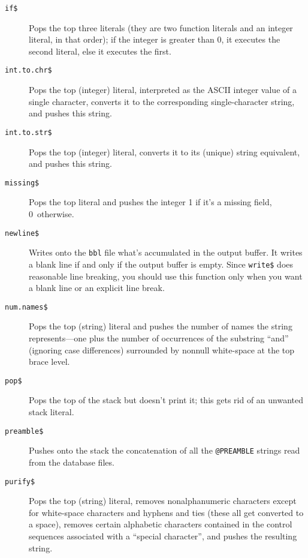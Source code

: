 \begin{description}
\item[\hbox{\tt if\$}\hfill]
Pops the top three literals (they
are two function literals and an integer literal, in that order);
if the integer is greater than 0, it executes the second literal,
else it executes the first.

\item[\hbox{\tt int.to.chr\$}\hfill]
Pops the top (integer) literal,
interpreted as the ASCII integer value of a single character,
converts it to the corresponding single-character string, and pushes
this string.

\item[\hbox{\tt int.to.str\$}\hfill]
Pops the top (integer) literal,
converts it to its (unique) string equivalent, and pushes this string.

\item[\hbox{\tt missing\$}\hfill]
Pops the top literal and
pushes the integer 1 if it's a missing field, 0~otherwise.

\item[\hbox{\tt newline\$}\hfill]
Writes onto the {\tt bbl} file
what's accumulated in the output buffer.
It writes a blank line if and only if the output buffer is empty.
Since \hbox{\tt write\$} does reasonable line breaking, you should use
this function only when you want a blank line or an explicit line break.

\item[\hbox{\tt num.names\$}\hfill]
Pops the top (string) literal
and pushes the number of names the string represents---one plus
the number of occurrences of the substring ``and'' (ignoring case differences)
surrounded by nonnull white-space at the top brace level.

\item[\hbox{\tt pop\$}\hfill]
Pops the top of the stack but
doesn't print it; this gets rid of an unwanted stack literal.

\item[\hbox{\tt preamble\$}\hfill]
Pushes onto the stack the concatenation of all the
\hbox{\tt @PREAMBLE} strings read from the database files.

\item[\hbox{\tt purify\$}\hfill]
Pops the top (string) literal,
removes nonalphanumeric characters except for white-space characters and
hyphens and ties (these all get converted to a space), removes
certain alphabetic characters contained in the control sequences
associated with a ``special character''$\!$, and pushes the resulting string.


\end{description}
